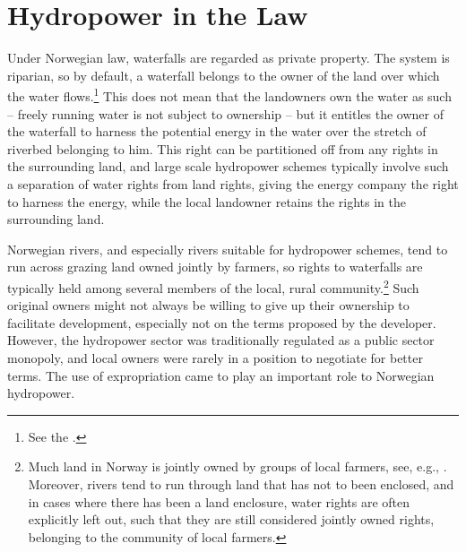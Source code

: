 \section{Hydropower in the Law}\label{sec:hl}

Under Norwegian law, waterfalls are regarded as private property. The system is riparian, so by default, a waterfall belongs to the owner of the land over which the water flows.\footnote{See the \cite[13]{wra00}.} This does not mean that the landowners own the water as such -- freely running water is not subject to ownership -- but it entitles the owner of the waterfall to harness the potential energy in the water over the stretch of riverbed belonging to him. This right can be partitioned off from any rights in the surrounding land, and large scale hydropower schemes typically involve such a separation of water rights from land rights, giving the energy company the right to harness the energy, while the local landowner retains the rights in the surrounding land.

Norwegian rivers, and especially rivers suitable for hydropower schemes, tend to run across grazing land owned jointly by farmers, so rights to waterfalls are typically held among several members of the local, rural community.\footnote{Much land in Norway is jointly owned by groups of local farmers, see, e.g., \cite[570]{stenseth07}. Moreover, rivers tend to run through land that has not to been enclosed, and in cases where there has been a land enclosure, water rights are often explicitly left out, such that they are still considered jointly owned rights, belonging to the community of local farmers.} Such original owners might not always be willing to give up their ownership to facilitate development, especially not on the terms proposed by the developer. However, the hydropower sector was traditionally regulated as a public sector monopoly, and local owners were rarely in a position to negotiate for better terms. The use of expropriation came to play an important role to Norwegian hydropower.




